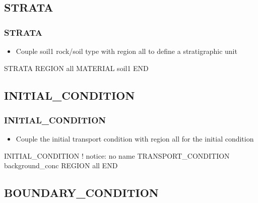 \documentclass{beamer}
\newcommand\bluecomment[1]{{{\color{blue} #1}}}
\newcommand\greencomment[1]{{{\color{green} #1}}}
\begin{document}
\subsection{STRATA}

\begin{frame}[fragile]\frametitle{STRATA}

\begin{itemize}
\item Couple \greencomment{soil1} rock/soil type with region \greencomment{all} to define a stratigraphic unit
\end{itemize}

\begin{semiverbatim}

STRATA
  REGION all
  MATERIAL soil1
END


\end{semiverbatim}

\end{frame}

\subsection{INITIAL\_CONDITION}

\begin{frame}[fragile]\frametitle{INITIAL\_CONDITION}

\begin{itemize}
\item Couple the \greencomment{initial} transport condition with region \greencomment{all} for the initial condition
\end{itemize}

\begin{semiverbatim}

INITIAL_CONDITION          \bluecomment{! notice: no name}
  TRANSPORT_CONDITION background_conc
  REGION all
END

\end{semiverbatim}

\end{frame}

\subsection{BOUNDARY\_CONDITION}
\end{document}
